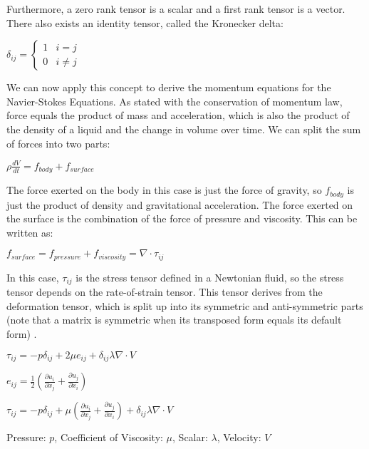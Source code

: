 \documentclass[12pt]{article}
\begin{document}
Furthermore, a zero rank tensor is a scalar and a first rank tensor is a vector. There also exists an identity tensor, called the Kronecker delta:

\begin{center}$ \delta_{ij} = \begin{cases} 1 & i=j\\ 0 & i\neq j\end{cases}$\end{center}

We can now apply this concept to derive the momentum equations for the Navier-Stokes Equations. As stated with the conservation of momentum law, force equals the product of mass and acceleration, which is also the product of the density of a liquid and the change in volume over time. We can split the sum of forces into two parts:
\begin{center}$ \rho \frac{dV}{dt} = f_{body} + f_{surface}$
\end{center}
The force exerted on the body in this case is just the force of gravity, so $f_{body}$ is just the product of density and gravitational acceleration. The force exerted on the surface is the combination of the force of pressure and viscosity. This can be written as:
\begin{center}$f_{surface} = f_{pressure}+f_{viscosity} = \nabla \cdot \tau_{ij}$\end{center}

In this case, $\tau_{ij}$ is the stress tensor defined in a Newtonian fluid, so the stress tensor depends on the rate-of-strain tensor. This tensor derives from the deformation tensor, which is split up into its symmetric and anti-symmetric parts (note that a matrix is symmetric when its transposed form equals its default form) \cite{Stress}.

\begin{center}$ \tau_{ij} = -p\delta_{ij} + 2\mu e_{ij} + \delta_{ij} \lambda \nabla \cdot V$\end{center}
\begin{center}$ e_{ij} = \frac{1}{2}(\frac{\partial u_i}{\partial x_j} + \frac{\partial u_j}{\partial x_i})$\end{center}
\begin{center}$ \tau_{ij} = -p\delta_{ij} + \mu (\frac{\partial u_i}{\partial x_j} + \frac{\partial u_j}{\partial x_i}) + \delta_{ij} \lambda \nabla \cdot V$\end{center}
\begin{center}Pressure: $p$, Coefficient of Viscosity: $\mu$, Scalar: $\lambda$, Velocity: $V$\end{center}
\end{document}
